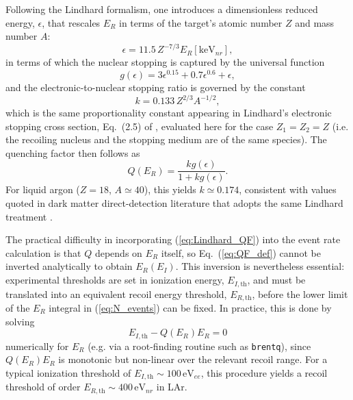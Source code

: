 Following the Lindhard formalism, one introduces a dimensionless reduced energy, $\epsilon$, that rescales $E_R$ in terms of the target's atomic number $Z$ and mass number $A$:
\begin{equation}
    \epsilon = 11.5\, Z^{-7/3} E_{R}[\text{keV}_{nr}],
\end{equation}
in terms of which the nuclear stopping is captured by the universal function
\begin{equation}
    g(\epsilon) = 3\epsilon^{0.15} + 0.7\epsilon^{0.6} + \epsilon,
\end{equation}
and the electronic-to-nuclear stopping ratio is governed by the constant
\begin{equation}
    k = 0.133\, Z^{2/3} A^{-1/2},
\end{equation}
which is the same proportionality constant appearing in Lindhard's electronic stopping cross section, Eq.~(2.5) of \cite{Lindhard1963}, evaluated here for the case $Z_1 = Z_2 = Z$ (i.e. the recoiling nucleus and the stopping medium are of the same species). The quenching factor then follows as
\begin{equation}
    Q(E_R) = \frac{k g(\epsilon)}{1 + k g(\epsilon)}.
    \label{eq:Lindhard_QF}
\end{equation}
For liquid argon ($Z=18$, $A \simeq 40$), this yields $k \simeq 0.174$, consistent with values quoted in dark matter direct-detection literature that adopts the same Lindhard treatment \cite{lewin1996}.

The practical difficulty in incorporating (\ref{eq:Lindhard_QF}) into the event rate calculation is that $Q$ depends on $E_R$ itself, so Eq.~(\ref{eq:QF_def}) cannot be inverted analytically to obtain $E_R(E_I)$. This inversion is nevertheless essential: experimental thresholds are set in ionization energy, $E_{I,\text{th}}$, and must be translated into an equivalent recoil energy threshold, $E_{R,\text{th}}$, before the lower limit of the $E_R$ integral in (\ref{eq:N_events}) can be fixed. In practice, this is done by solving
\begin{equation}
    E_{I,\text{th}} - Q(E_R) E_R = 0
    \label{eq:QF_inversion}
\end{equation}
numerically for $E_R$ (e.g. via a root-finding routine such as \texttt{brentq}), since $Q(E_R)E_R$ is monotonic but non-linear over the relevant recoil range. For a typical ionization threshold of $E_{I,\text{th}} \sim 100\, \text{eV}_{ee}$, this procedure yields a recoil threshold of order $E_{R,\text{th}} \sim 400\, \text{eV}_{nr}$ in LAr.


